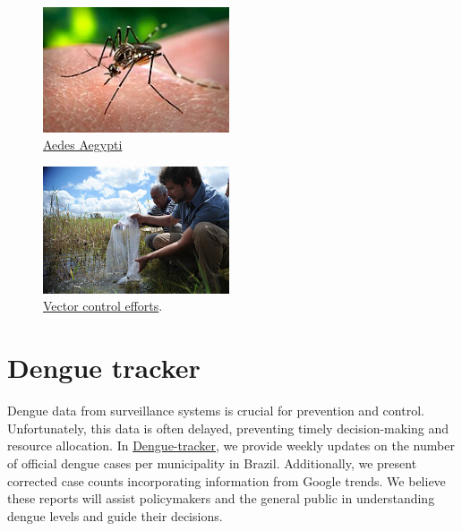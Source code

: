 \documentclass[
  letterpaper,
  DIV=11,
  numbers=noendperiod]{scrreprt}
\begin{document}
\begin{figure}

{\centering \includegraphics[width=0.49\textwidth,height=\textheight]{img/aedesaegypti.jpg}

}

\caption{\label{fig-aedesaegypti}\href{https://en.wikipedia.org/wiki/Aedes_aegypti\#/media/File:Aedes_aegypti_CDC-Gathany.jpg}{Aedes
Aegypti}}

\end{figure}

\begin{figure}

{\centering \includegraphics[width=0.49\textwidth,height=\textheight]{img/vectorcontrolefforts.jpg}

}

\caption{\label{fig-vectorcontrolefforts}\href{https://en.wikipedia.org/wiki/Dengue_fever\#/media/File:Equipes_usam_t\%C3\%A9cnicas_de_combate_\%C3\%A0_dengue_em_Bras\%C3\%ADlia.jpg}{Vector
control efforts}.}

\end{figure}

\hypertarget{dengue-tracker}{%
\chapter{Dengue tracker}\label{dengue-tracker}}

Dengue data from surveillance systems is crucial for prevention and
control. Unfortunately, this data is often delayed, preventing timely
decision-making and resource allocation. In
\href{https://diseasesurveillance.github.io/dengue-tracker/index.html}{Dengue-tracker},
we provide weekly updates on the number of official dengue cases per
municipality in Brazil. Additionally, we present corrected case counts
incorporating information from Google trends. We believe these reports
will assist policymakers and the general public in understanding dengue
levels and guide their decisions.
\end{document}

